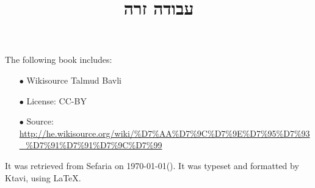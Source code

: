 \documentclass[12pt, openany]{book}
\newcommand{\texttitle}{עבודה זרה}\usepackage{titlesec}
\begin{document}
\frontmatter
{}

\title{\texttitle}

\author{}

\date{}

\maketitle

\begin{minipage}[b][\textheight][b]{\textwidth}\englishfont	
	\begin{english}
		\vfill
		The following book includes:
\begin{itemize}
\item[$\bullet$] Wikisource Talmud Bavli
\item[$\bullet$] License: CC-BY
\item[$\bullet$] Source: \url{http://he.wikisource.org/wiki/%D7%AA%D7%9C%D7%9E%D7%95%D7%93_%D7%91%D7%91%D7%9C%D7%99}
\end{itemize}
		It was retrieved from Sefaria on \today\space \texthebrew{(\Hebrewtoday)}.  It was typeset and formatted by Ktavi, using \LaTeX .
		\clearpage
		
	\end{english}
\end{minipage}


\tableofcontents

\clearpage
\mainmatter
{}
\end{document}
